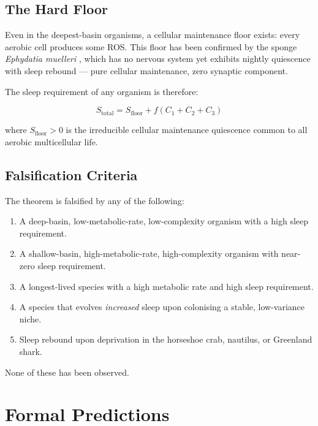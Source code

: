 \documentclass[12pt, a4paper]{article}
\begin{document}
\subsection{The Hard Floor}

Even in the deepest-basin organisms, a cellular maintenance
floor exists: every aerobic cell produces some ROS. This
floor has been confirmed by the sponge \textit{Ephydatia
muelleri} \cite{siebert2022}, which has no nervous system yet
exhibits nightly quiescence with sleep rebound --- pure cellular
maintenance, zero synaptic component.

The sleep requirement of any organism is therefore:

\begin{equation}
    S_{\text{total}} = S_{\text{floor}} + f(C_1 + C_2 + C_3)
    \label{eq:sleep_full}
\end{equation}

where $S_{\text{floor}} > 0$ is the irreducible cellular
maintenance quiescence common to all aerobic multicellular
life.

\subsection{Falsification Criteria}

The theorem is falsified by any of the following:

\begin{enumerate}
    \item A deep-basin, low-metabolic-rate, low-complexity
          organism with a high sleep requirement.
    \item A shallow-basin, high-metabolic-rate, high-complexity
          organism with near-zero sleep requirement.
    \item A longest-lived species with a high metabolic rate
          and high sleep requirement.
    \item A species that evolves \textit{increased} sleep
          upon colonising a stable, low-variance niche.
    \item Sleep rebound upon deprivation in the
          horseshoe crab, nautilus, or Greenland shark.
\end{enumerate}

None of these has been observed.

\section{Formal Predictions}
\label{sec:predictions}
\end{document}
